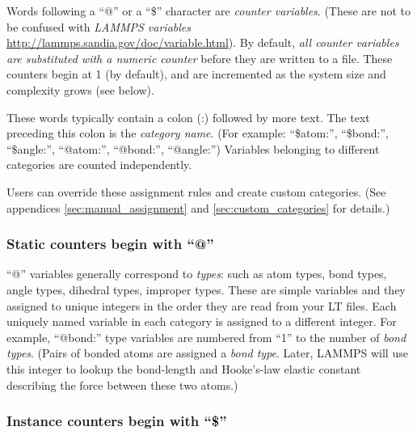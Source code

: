 \documentclass[11pt]{article}
\begin{document}
Words following a ``@'' or a ``\$'' character
are \textit{counter variables}. 
(These are not to be confused with \textit{LAMMPS variables}
 \url{http://lammps.sandia.gov/doc/variable.html}).
By default, 
\textit{all counter variables are substituted with a numeric counter}
before they are written to a file. 
These counters begin at 1 (by default), and 
are incremented as the system size and complexity grows (see below).

These words typically contain a colon (:) followed by more text.
The text preceding this colon is the \textit{category name}. 
(For example: ``\$atom:'', ``\$bond:'', ``\$angle:'', 
     ``@atom:'', ``@bond:'', ``@angle:'') 
Variables belonging to different categories 
are counted independently. 

Users can override these assignment rules and create custom categories.
(See appendices \ref{sec:manual_assignment} and \ref{sec:custom_categories}
for details.)

\subsubsection{Static counters begin with ``@''}
\label{sec:static_variables}

``@'' variables generally correspond to \textit{types}: 
such as atom types, bond types, angle types, dihedral types, improper types.
These are simple variables and they assigned to unique integers in the 
order they are read from your LT files.
Each uniquely named variable in each category is assigned to a different 
integer.  For example, ``@bond:'' type variables are numbered from ``1''
to the number of \textit{bond types}.
(Pairs of bonded atoms are assigned a \textit{bond type}. 
Later, LAMMPS will use this integer to lookup the bond-length and Hooke's-law 
elastic constant describing the force between these two atoms.)


\subsubsection{Instance counters begin with ``\$''}
\label{sec:instance_variables}
\end{document}
